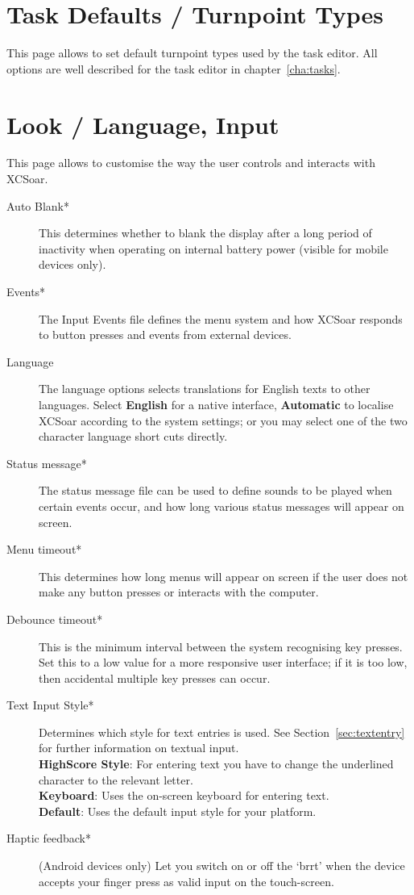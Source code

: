 \section{Task Defaults / Turnpoint Types}

This page allows to set default turnpoint types used by the task editor. All 
options are well described for the task editor in chapter~\ref{cha:tasks}.


\section{Look / Language, Input}\label{sec:interface}

This page allows to customise the way the user controls and interacts with
XCSoar.

\begin{description}
\item[Auto Blank*] This determines whether to blank the display after a long
  period of inactivity when operating on internal battery power (visible for mobile 
  devices only).
\item[Events*]  The Input Events file defines the menu system and how XCSoar
  responds to button presses and events from external devices.
\item[Language]  The language options selects translations for English texts to
  other languages.  Select {\bf English} for a native interface, {\bf Automatic}
  to localise XCSoar according to the system settings; or you may select one of 
  the two character language short cuts directly.
\item[Status message*]  The status message file can be used to define sounds to 
  be played when certain events occur, and how long various status messages will 
  appear on screen.
\item[Menu timeout*]  This determines how long menus will appear on screen if the user
  does not make any button presses or interacts with the computer.
\item[Debounce timeout*]  This is the minimum interval between the system 
  recognising key presses.  Set this to a low value for a more responsive user 
  interface; if it is too low, then accidental multiple key presses can occur.
\item[Text Input Style*]  Determines which style for text entries is used. 
  See Section~\ref{sec:textentry} for further information on textual input. \\
  {\bf HighScore Style}: For entering text you have to change the underlined 
  character to the relevant letter. \\
  {\bf Keyboard}: Uses the on-screen keyboard for entering text. \\
  {\bf Default}: Uses the default input style for your platform.
\item[Haptic feedback*]  (Android devices only) Let you switch on or off the `brrt' 
  when the device accepts your finger press as valid input on the touch-screen.
\end{description}


